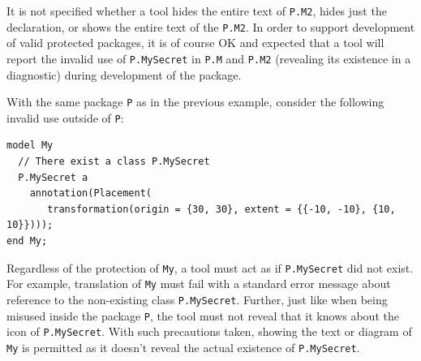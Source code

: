 \begin{example}
It is not specified whether a tool hides the entire text of \lstinline!P.M2!, hides just the declaration, or shows the entire text of the \lstinline!P.M2!.
In order to support development of valid protected packages, it is of course OK and expected that a tool will report the invalid use of \lstinline!P.MySecret! in \lstinline!P.M! and \lstinline!P.M2! (revealing its existence in a diagnostic) during development of the package.
\end{example}

\begin{example}
With the same package \lstinline!P! as in the previous example, consider the following invalid use outside of \lstinline!P!:
\begin{lstlisting}[language=modelica]
model My
  // There exist a class P.MySecret
  P.MySecret a
    annotation(Placement(
       transformation(origin = {30, 30}, extent = {{-10, -10}, {10, 10}})));
end My;
\end{lstlisting}
Regardless of the protection of \lstinline!My!, a tool must act as if \lstinline!P.MySecret! did not exist.
For example, translation of \lstinline!My! must fail with a standard error message about reference to the non-existing class \lstinline!P.MySecret!.
Further, just like when being misused inside the package \lstinline!P!, the tool must not reveal that it knows about the icon of \lstinline!P.MySecret!.
With such precautions taken, showing the text or diagram of \lstinline!My! is permitted as it doesn't reveal the actual existence of \lstinline!P.MySecret!.
\end{example}


